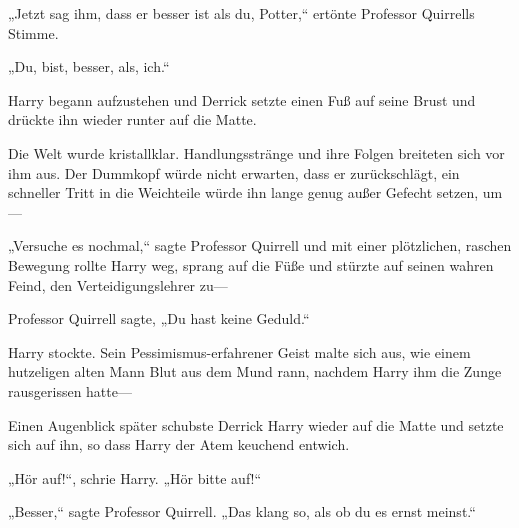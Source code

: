 „Jetzt sag ihm, dass er besser ist als du, Potter,“ ertönte Professor Quirrells Stimme.

„Du, bist, besser, als, ich.“

Harry begann aufzustehen und Derrick setzte einen Fuß auf seine Brust und drückte ihn wieder runter auf die Matte.

Die Welt wurde kristallklar. Handlungsstränge und ihre Folgen breiteten sich vor ihm aus. Der Dummkopf würde nicht erwarten, dass er zurückschlägt, ein schneller Tritt in die Weichteile würde ihn lange genug außer Gefecht setzen, um—

„Versuche es nochmal,“ sagte Professor Quirrell und mit einer plötzlichen, raschen Bewegung rollte Harry weg, sprang auf die Füße und stürzte auf seinen wahren Feind, den Verteidigungslehrer zu—

Professor Quirrell sagte, „Du hast keine Geduld.“

Harry stockte. Sein Pessimismus-erfahrener Geist malte sich aus, wie einem hutzeligen alten Mann Blut aus dem Mund rann, nachdem Harry ihm die Zunge rausgerissen hatte—

Einen Augenblick später schubste Derrick Harry wieder auf die Matte und setzte sich auf ihn, so dass Harry der Atem keuchend entwich.

„Hör auf!“, schrie Harry. „Hör bitte auf!“

„Besser,“ sagte Professor Quirrell. „Das klang so, als ob du es ernst meinst.“

